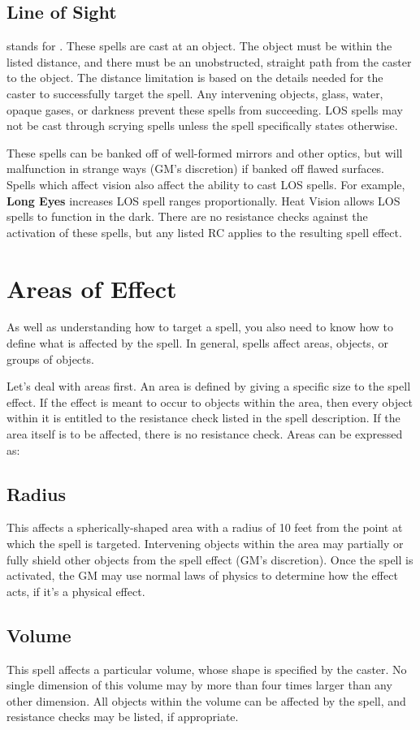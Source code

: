 \begin{multicols*}{2}
\subsection{Line of Sight}
 \LOS stands for . These spells are cast at an object. The object must be within the listed distance, and there must be an unobstructed, straight path from the caster to the object. The distance limitation is based on the details needed for the caster to successfully target the spell. Any intervening objects, glass, water, opaque gases, or darkness prevent these spells from succeeding. LOS spells may not be cast through scrying spells unless the spell specifically states otherwise.

These spells can be banked off of well-formed mirrors and other optics, but will malfunction in strange ways (GM's discretion) if banked off flawed surfaces. Spells which affect vision also affect the ability to cast LOS spells. For example, \textbf{Long Eyes} increases LOS spell ranges proportionally. Heat Vision allows LOS spells to function in the dark. There are no resistance checks against the activation of these spells, but any listed RC applies to the resulting spell effect.
\section{Areas of Effect}
As well as understanding how to target a spell, you also need to know how to define what is affected by the spell. In general, spells affect areas, objects, or groups of objects.

Let's deal with areas first. An area is defined by giving a specific size to the spell effect. If the effect is meant to occur to objects within the area, then every object within it is entitled to the resistance check listed in the spell description. If the area itself is to be affected, there is no resistance check. Areas can be expressed as:
\subsection{Radius}
 This affects a spherically-shaped area with a radius of 10 feet from the point at which the spell is targeted. Intervening objects within the area may partially or fully shield other objects from the spell effect (GM's discretion). Once the spell is activated, the GM may use normal laws of physics to determine how the effect acts, if it's a physical effect.
\subsection{Volume}
 This spell affects a particular volume, whose shape is specified by the caster. No single dimension of this volume may by more than four times larger than any other dimension. All objects within the volume can be affected by the spell,
and resistance checks may be listed, if appropriate.

\end{multicols*}
